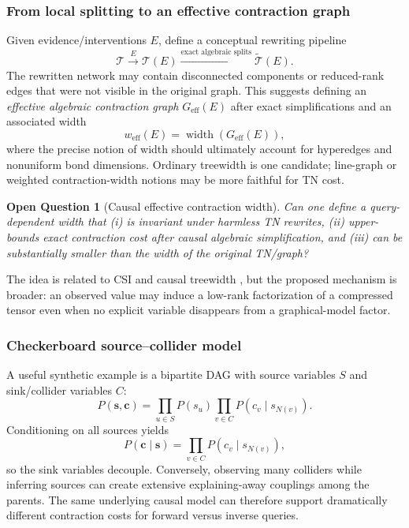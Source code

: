 \documentclass[11pt]{article}
\newtheorem{question}[definition]{Open Question}
\theoremstyle{remark}
\newcommand{\cT}{\mathcal T}
\begin{document}
\subsubsection{From local splitting to an effective contraction graph}

Given evidence/interventions $E$, define a conceptual rewriting pipeline
\begin{equation}
\cT
\xrightarrow{\ E\ }
\cT(E)
\xrightarrow{\text{exact algebraic splits}}
\widetilde{\cT}(E).
\end{equation}
The rewritten network may contain disconnected components or reduced-rank edges that were not visible in the original graph. This suggests defining an \emph{effective algebraic contraction graph} $G_{\mathrm{eff}}(E)$ after exact simplifications and an associated width
\begin{equation}
w_{\mathrm{eff}}(E)=\operatorname{width}(G_{\mathrm{eff}}(E)),
\end{equation}
where the precise notion of width should ultimately account for hyperedges and nonuniform bond dimensions. Ordinary treewidth is one candidate; line-graph or weighted contraction-width notions may be more faithful for TN cost.

\begin{question}[Causal effective contraction width]
Can one define a query-dependent width that (i) is invariant under harmless TN rewrites, (ii) upper-bounds exact contraction cost after causal algebraic simplification, and (iii) can be substantially smaller than the width of the original TN/graph?
\end{question}

The idea is related to CSI and causal treewidth \cite{boutilier1996context,chen2022causal}, but the proposed mechanism is broader: an observed value may induce a low-rank factorization of a compressed tensor even when no explicit variable disappears from a graphical-model factor.

\subsubsection{Checkerboard source--collider model}

A useful synthetic example is a bipartite DAG with source variables $S$ and sink/collider variables $C$:
\begin{equation}
P(\bm s,\bm c)=\prod_{u\in S}P(s_u)\prod_{v\in C}P(c_v\mid s_{N(v)}).
\end{equation}
Conditioning on all sources yields
\begin{equation}
P(\bm c\mid\bm s)=\prod_{v\in C}P(c_v\mid s_{N(v)}),
\end{equation}
so the sink variables decouple. Conversely, observing many colliders while inferring sources can create extensive explaining-away couplings among the parents. The same underlying causal model can therefore support dramatically different contraction costs for forward versus inverse queries.
\end{document}
